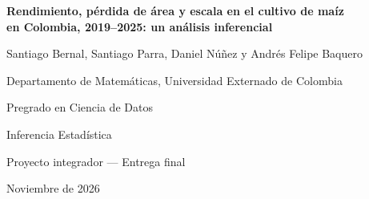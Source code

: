 \thispagestyle{fancy}
\begin{center}
\vspace*{3cm}

{\bfseries Rendimiento, pérdida de área y escala en el cultivo de maíz\\[2pt]
en Colombia, 2019--2025: un análisis inferencial}

\vspace{1.2cm}

Santiago Bernal, Santiago Parra, Daniel Núñez y Andrés Felipe Baquero

\vspace{0.7cm}

Departamento de Matemáticas, Universidad Externado de Colombia

\vspace{0.7cm}

Pregrado en Ciencia de Datos

\vspace{0.7cm}

Inferencia Estadística

\vspace{0.7cm}

Proyecto integrador --- Entrega final

\vspace{0.7cm}

Noviembre de 2026

\end{center}
\newpage
